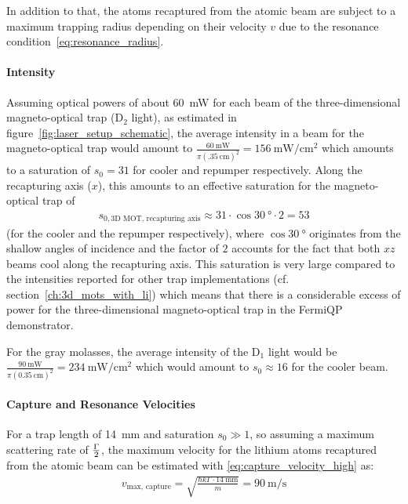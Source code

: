 In addition to that, the atoms recaptured from the atomic beam are subject to a maximum trapping radius depending on their velocity $v$ due to the resonance condition~\eqref{eq:resonance_radius}.

\paragraph{Intensity}
Assuming optical powers of about \SI{60}{\milli\watt} for each beam of the three-dimensional magneto-optical trap (D$_2$ light), as estimated in figure~\ref{fig:laser_setup_schematic}, the average intensity in a beam for the magneto-optical trap would amount to $\frac{\SI{60}{\milli\watt}}{\pi (\SI{.35}{\centi\meter})^2} = \SI{156}{\milli\watt\per\centi\meter\squared}$ which amounts to a saturation of $s_0 = 31$ for cooler and repumper respectively. Along the recapturing axis ($x$), this amounts to an effective saturation for the magneto-optical trap of
\begin{align}
    s_{0, \text{3D MOT, recapturing axis}} \approx 31 \cdot \cos \SI{30}{\degree} \cdot 2 = 53
\end{align}
(for the cooler and the repumper respectively), where $\cos \SI{30}{\degree}$ originates from the shallow angles of incidence and the factor of $2$ accounts for the fact that both $xz$ beams cool along the recapturing axis. This saturation is very large compared to the intensities reported for other trap implementations (cf. section~\ref{ch:3d_mots_with_li}) which means that there is a considerable excess of power for the three-dimensional magneto-optical trap in the FermiQP demonstrator.

For the gray molasses, the average intensity of the D$_1$ light would be $\frac{\SI{90}{\milli\watt}}{\pi (\SI{0.35}{\centi\meter})^2} = \SI{234}{\milli\watt\per\centi\meter\squared}$ which would amount to $s_0 \approx 16$ for the cooler beam.

\paragraph{Capture and Resonance Velocities}
For a trap length of \SI[]{14}{\milli\meter} and saturation $s_0 \gg 1$, so assuming a maximum scattering rate of $\Gamma \over 2$, the maximum velocity for the lithium atoms recaptured from the atomic beam can be estimated with \eqref{eq:capture_velocity_high} as:
\begin{align}
    v_\text{max, capture} = \sqrt{\frac{\hbar k \Gamma \cdot \SI[]{14}{\milli\meter}}{m}} = \SI[]{90}{\meter\per\second}
\end{align}

